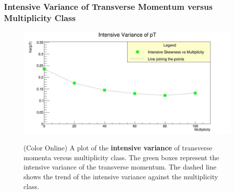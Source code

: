 \documentclass[letterpaper,aps,prc,superscriptaddress,nofootinbib,10pt,showpacs,floatfix]{revtex4-2}%
\begin{document}
\subsubsection{Intensive Variance of Transverse Momentum versus Multiplicity Class}
\label{subsubsec:intvar}
\vspace{-5mm}
\begin{figure}[!htb]
\begin{minipage}{\textwidth}
   \label{Fig:7}
     \centering
     \renewcommand{\thefigure}{7}
     \includegraphics[width=\linewidth]{intvar}
     \begin{minipage}{0.8\textwidth}
     \caption{(Color Online) A plot of the \textbf{intensive variance} of transverse momenta versus multiplicity class. The green boxes represent the intensive variance of the transverse momentum. The dashed line shows the trend of the intensive variance against the multiplicity class.}
     \end{minipage}
\end{minipage}
\end{figure}

\FloatBarrier
\vspace{-3mm}
\pagebreak
\end{document}
